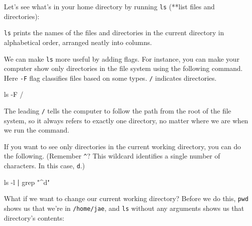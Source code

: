 \documentclass[
]{book}
\newenvironment{Shaded}{\begin{snugshade}}{\end{snugshade}}
\newcommand{\AttributeTok}[1]{\textcolor[rgb]{0.77,0.63,0.00}{#1}}
\newcommand{\ExtensionTok}[1]{#1}
\newcommand{\FunctionTok}[1]{\textcolor[rgb]{0.00,0.00,0.00}{#1}}
\newcommand{\KeywordTok}[1]{\textcolor[rgb]{0.13,0.29,0.53}{\textbf{#1}}}
\newcommand{\NormalTok}[1]{#1}
\newcommand{\StringTok}[1]{\textcolor[rgb]{0.31,0.60,0.02}{#1}}
\begin{document}
Let's see what's in your home directory by running \texttt{ls} (**list files and directories):

\begin{Shaded}
\end{Shaded}

\texttt{ls} prints the names of the files and directories in the current directory in alphabetical order, arranged neatly into columns.

We can make \texttt{ls} more useful by adding flags. For instance, you can make your computer show only directories in the file system using the following command. Here \texttt{-F} flag classifies files based on some types. \texttt{/} indicates directories.

\begin{Shaded}
\begin{Highlighting}[]
\FunctionTok{ls} \AttributeTok{{-}F}\NormalTok{ /}
\end{Highlighting}
\end{Shaded}

The leading \texttt{/} tells the computer to follow the path from the root of the file system, so it always refers to exactly one directory, no matter where we are when we run the command.

If you want to see only directories in the current working directory, you can do the following. (Remember \texttt{\^{}}? This wildcard identifies a single number of characters. In this case, \texttt{d}.)

\begin{Shaded}
\begin{Highlighting}[]
\FunctionTok{ls} \AttributeTok{{-}l} \KeywordTok{|} \FunctionTok{grep} \StringTok{"\^{}d"}
\end{Highlighting}
\end{Shaded}

What if we want to change our current working directory? Before we do this, \texttt{pwd} shows us that we're in \texttt{/home/jae}, and \texttt{ls} without any arguments shows us that directory's contents:
\end{document}
